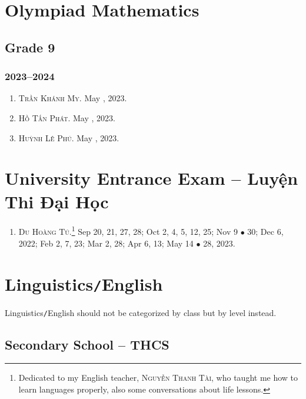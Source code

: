 \documentclass{article}
\begin{document}

\section{Olympiad Mathematics}

\subsection{Grade 9}

\subsubsection{2023--2024}

\begin{enumerate}
	\item \textsc{Trần Khánh My.} May , 2023.
	\item \textsc{Hồ Tấn Phát.} May , 2023.
	\item \textsc{Huỳnh Lê Phú.} May , 2023.
\end{enumerate}


\section{University Entrance Exam -- Luyện Thi Đại Học}

\begin{enumerate}
	\item \textsc{Du Hoàng Tú.}\footnote{Dedicated to my English teacher, \textsc{Nguyễn Thanh Tài}, who taught me how to learn languages properly, also some conversations about life lessons.} {\sf[In]} Sep 20, 21, 27, 28; Oct 2, 4, 5, 12, 25; Nov 9 $\bullet$ 30; Dec 6, 2022; Feb 2, 7, 23; Mar 2, 28; Apr 6, 13; May 14 $\bullet$ 28, 2023.
\end{enumerate}


\section{Linguistics\texttt{/}English}
Linguistics\texttt{/}English should not be categorized by class but by level instead.

\subsection{Secondary School -- THCS}
\end{document}

